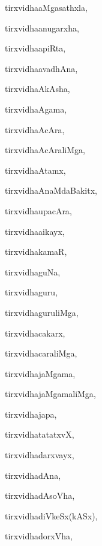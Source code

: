 \begin{multicols}{3}
{\noindent
{tirxvi{dha}aMgasathxla}, \pageref{tirxvidhaaMgasathxla}

\noindent
{tirxvi{dha}anugarxha}, \pageref{tirxvidhaanugarxha}

\noindent
{tirxvi{dha}apiRta}, \pageref{tirxvidhaapiRta}

\noindent
{tirxvi{dha}avadhAna}, \pageref{tirxvidhaavadhAna}

\noindent
{tirxvi{dha}AkAsha}, \pageref{tirxvidhaAkAsha}

\noindent
{tirxvi{dha}Agama}, \pageref{tirxvidhaAgama}

\noindent
{tirxvi{dha}AcAra}, \pageref{tirxvidhaAcAra}

\noindent
{tirxvi{dha}AcAraliMga}, \pageref{tirxvidhaAcAraliMga}

\noindent
{tirxvi{dha}Atamx}, \pageref{tirxvidhaAtamx}

\noindent
{tirxvi{dha}AnaMdaBakitx}, \pageref{tirxvidhaAnaMdaBakitx}

\noindent
{tirxvi{dha}upacAra}, \pageref{tirxvidhaupacAra}

\noindent
{tirxvi{dha}aikayx}, \pageref{tirxvidhaaikayx}

\noindent
{tirxvidhakamaR}, \pageref{tirxvidhakamaR}

\noindent
{tirxvidhaguNa}, \pageref{tirxvidhaguNa}

\noindent
{tirxvidhaguru}, \pageref{tirxvidhaguru}

\noindent
{tirxvidhaguruliMga}, \pageref{tirxvidhaguruliMga}

\noindent
{tirxvidhacakarx}, \pageref{tirxvidhacakarx}

\noindent
{tirxvidhacaraliMga}, \pageref{tirxvidhacaraliMga}

\noindent
{tirxvidhajaMgama}, \pageref{tirxvidhajaMgama}

\noindent
{tirxvidhajaMgamaliMga}, \pageref{tirxvidhajaMgamaliMga}

\noindent
{tirxvidhajapa}, \pageref{tirxvidhajapa}

\noindent
{tirxvidhatatatxvX}, \pageref{tirxvidhatatatxvX}

\noindent
{tirxvidhadarxvayx}, \pageref{tirxvidhadarxvayx}

\noindent
{tirxvidhadAna}, \pageref{tirxvidhadAna}

\noindent
{tirxvidhadAsoVha}, \pageref{tirxvidhadAsoVha}

\noindent
{tirxvidhadiVkeSx(kASx)}, \pageref{tirxvidhadiVkeSxkASx}

\noindent
{tirxvidhadorxVha}, \pageref{tirxvidhadorxVha}

}
\end{multicols}
